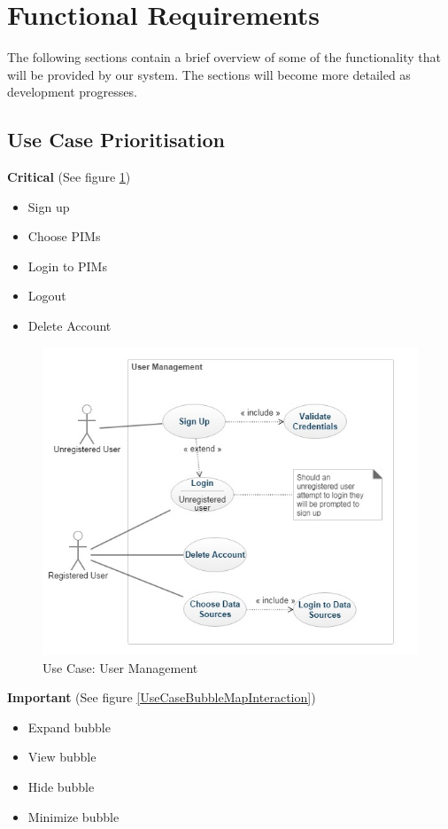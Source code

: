 \documentclass[hidelinks,english]{article}
\begin{document}
	\section{Functional Requirements}		
		The following sections contain a brief overview of some of the functionality that will be provided by our system. The sections will become more detailed as development progresses.
		\subsection{Use Case Prioritisation}
			\textbf{Critical} (See figure \ref{UseCaseUserManagement})
			\begin{itemize}
			    \item Sign up
			    \item Choose PIMs
			    \item Login to PIMs
			    \item Logout
			    \item Delete Account
			\end{itemize}
			\begin{figure}[!h]
				\includegraphics[width=\linewidth]{UserManagement.jpg}
				\caption{Use Case: User Management}
				\label{UseCaseUserManagement}
			\end{figure}
			\textbf{Important} (See figure \ref{UseCaseBubbleMapInteraction})
			\begin{itemize}
			    \item Expand bubble
			   	\item View bubble
			    \item Hide bubble
			    \item Minimize bubble
			\end{itemize}
\end{document}
